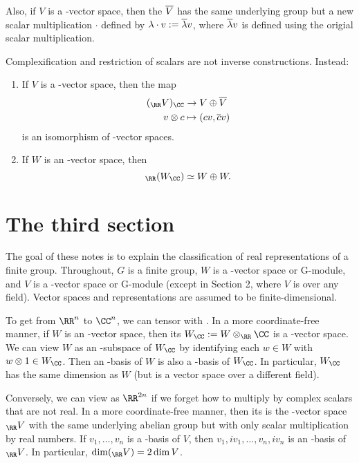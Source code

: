 \documentclass{scrartcl}
\begin{document}
Also, if $V$ is a \CC-vector space, then the  $\overline{V}$ has the same underlying group but a new scalar multiplication $\cdot$ defined by $\lambda\cdot v := \overline{\lambda}v$, where $\overline{\lambda}v$ is defined using the origial scalar multiplication.

Complexification and restriction of scalars are not inverse constructions. Instead:
\begin{proposition}
    \hfill
    \begin{enumerate}[font=\normalfont]
        \item If $V$ is a \CC-vector space, then the map \begin{align*}
            (_{\RR} V)_{\CC} &\rightarrow V \oplus \ol{V} \\
            v\otimes c &\mapsto (cv,\ol{c}v) \\
        \end{align*} is an isomorphism of \CC-vector spaces.
        \item If $W$ is an \RR-vector space, then \[_{\RR}(W_{\CC}) \simeq W\oplus W.\]
    \end{enumerate}
\end{proposition}

\section{The third section}


The goal of these notes is to explain the classification of real representations of a finite
group. Throughout, $G$ is a finite group, $W$ is a \RR-vector space or \RR G-module, and $V$ is a
\CC-vector space or \CC G-module (except in Section 2, where $V$ is over any field). Vector spaces
and representations are assumed to be finite-dimensional.

To get from $\RR^n$ to $\CC^n$, we can tensor with \CC. In a more coordinate-free
manner, if $W$ is an \RR-vector space, then its  $W_{\CC} := W \otimes_{\RR} \CC$ is a \CC-vector
space. We can view $W$ as an \RR-subspace of $W_{\CC}$ by identifying each $w \in W$ with $w \otimes 1 \in W_{\CC}$.
Then an \RR-basis of $W$ is also a \CC-basis of $W_{\CC}$. In particular, $W_{\CC}$ has the same dimension as
$W$ (but is a vector space over a different field).

Conversely, we can view \CC[n] as $\RR^{2n}$ if we forget how to multiply by complex scalars that are not real. In a more coordinate-free manner, then its  is the \RR-vector space $_{\RR} V$ with the same underlying abelian group but with only scalar multiplication by real numbers. If $v_1,\dots,v_n$ is a \CC-basis of $V$, then $v_1, iv_1,\dots,v_n,iv_n$ is an \RR-basis of $_{\RR} V$. In particular, $\dim(_{\RR} V) = 2\dim V$.
\end{document}
